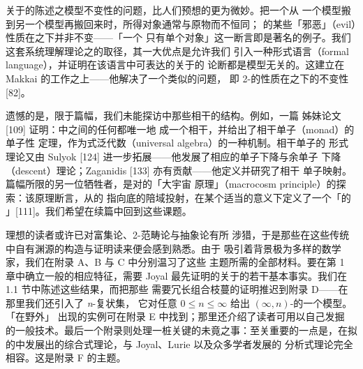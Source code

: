 关于\trInfinityCategory{}的陈述之模型不变性的问题，比人们预想的更为微妙。把一个\trInfinityCategory{}从
一个模型搬到另一个模型再搬回来时，所得对象通常与原物\trEquivalence{}而不恒同；\trInfinityCategory
的某些「邪恶」（evil）性质在\trEquivalence{}之下并非不变——「一个\trInfinityCategory
只有单个对象」这一断言即是著名的例子。我们这套系统理解\trInfinityCategory{}理论之\trModelIndependence{}的取径，其一大优点是允许我们
引入一种形式语言（formal language），并证明在该语言中可表达的关于\trInfinityCategory{}的
论断都是模型无关的。这建立在 Makkai 的工作之上——他解决了一个类似的问题，
即 2-\trCategory{}的性质在\trBiequivalence{}之下的不变性 [82]。

遗憾的是，限于篇幅，我们未能探访\trInfinityCosmos{}中那些\trHomotopy{}相干的结构。例如，一篇
姊妹论文 [109] 证明：\trInfinityCosmos{}中\trInfinityCategory{}之间的任何\trAdjunction{}都\trHomotopy{}唯一地%
\trExtension{}成一个\trHomotopy{}相干\trAdjunction{}，并给出了\trHomotopy{}相干单子（monad）的单子性
定理，作为\trInfinityCategory{}式泛代数（universal algebra）的一种机制。\trHomotopy{}相干单子的
形式理论又由 Sulyok [124] 进一步拓展——他发展了相应的单子下降与余单子
下降（descent）理论；Zaganidis [133] 亦有贡献——他定义并研究了\trHomotopy{}相干
单子映射。篇幅所限的另一位牺牲者，是对\trCartesianFibration{}的「大宇宙
原理」（macrocosm principle）的探索：该原理断言，从\trCartesianFibration{}的\trInfinityCosmos
指向底\trInfinityCosmos{}的陪域投射\trFunctor{}，在某个适当的意义下定义了一个「\trInfinityCosmos{}的%
\trCartesianFibration」[111]。我们希望在续篇中回到这些课题。

理想的读者或许已对富集\trEnrichedCategory{}论、2-范畴论与抽象\trHomotopy{}论有所
涉猎，于是那些在这些传统中自有渊源的构造与证明读来便会感到熟悉。由于%
\trInfinityCategory{}吸引着背景极为多样的数学家，我们在附录 A、B 与 C 中分别温习了这些
主题所需的全部材料。要在第 1 章中确立一般\trInfinityCosmos{}的相应特征，需要 Joyal
最先证明的关于\trQuasiCategory{}的若干基本事实。我们在 1.1 节中陈述这些结果，而把那些
需要冗长组合枝蔓的证明推迟到附录 D——在那里我们还引入了 \emph{n}-复状集，
它对任意 $0\le n\le\infty$ 给出 $(\infty,n)$-\trCategory{}的一个模型。「在野外」
出现的\trInfinityCosmos{}实例可在附录 E 中找到；那里还介绍了读者可用以自己发掘\trInfinityCosmos
的一般技术。最后一个附录则处理一桩关键的未竟之事：至关重要的一点是，在拟%
\trCategory{}的\trInfinityCosmos{}中发展出的综合式理论，与 Joyal、Lurie 以及众多学者发展的
分析式理论完全相容。这是附录 F 的主题。


